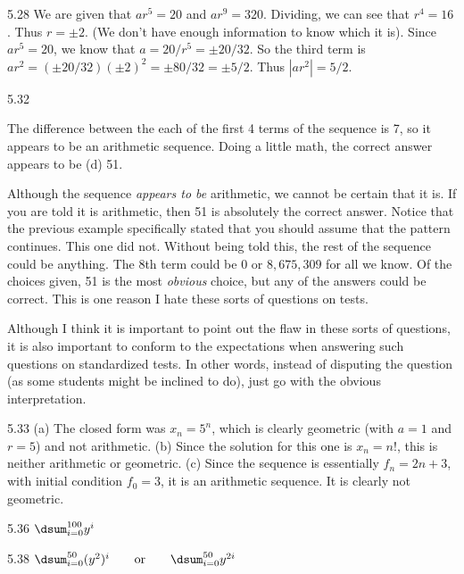 \begin{Answer}{5.28}
We are given that $ar^5 = 20$ and $ar^9 = 320$.
Dividing, we can see that $r^4=16$.  Thus $r=\pm 2$.
(We don't have enough information to know which it is).
Since $ar^5=20$, we know that $a=20/r^5=\pm 20/32$.
So the third term is $ar^2=(\pm 20/32)(\pm 2)^2=\pm 80/32 = \pm 5/2$.
Thus $|ar^2|=5/2$.
\end{Answer}
\begin{Answer}{5.32}
\begin{lenum}
\item
The difference between the each of the first 4 terms of the sequence is 7, so it
appears to be an arithmetic sequence.  Doing a little math, the correct answer
appears to be (d) 51.
\item
Although the sequence {\em appears to be} arithmetic, we cannot be certain that it is.
If you are told it is arithmetic, then 51 is absolutely the correct answer.
Notice that the previous example specifically stated that you should assume that the
pattern continues.  This one did not.
Without being told this, the rest of the sequence could be anything.
The $8$th term could be $0$ or $8,675,309$ for all we know.
Of the choices given, 51 is the most {\em obvious} choice, but any of the answers
could be correct.  This is one reason I hate these sorts of questions on tests.

Although I think it is important to point out the flaw in these sorts of questions,
it is also important to conform to the expectations when answering such questions
on standardized tests.
In other words, instead of disputing the question (as some students might be inclined
to do), just go with the obvious interpretation.
\end{lenum}
\end{Answer}
\begin{Answer}{5.33}
(a) The closed form was $x_n=5^n$, which is clearly geometric (with $a=1$ and $r=5$) and not arithmetic.
(b) Since the solution for this one is $x_n=n!$, this is neither arithmetic or geometric.
(c) Since the sequence is essentially $f_n=2n+3$, with initial condition $f_0=3$, it is an
arithmetic sequence.  It is clearly not geometric.
\end{Answer}
\begin{Answer}{5.36}
$\dsum_{i=0}^{100} y^i$
\end{Answer}
\begin{Answer}{5.38}
$\dsum_{i=0}^{50} (y^2)^i \ \ \ \ \ \mbox{ or } \ \ \ \ \ \dsum_{i=0}^{50} y^{2i}$
\end{Answer}
